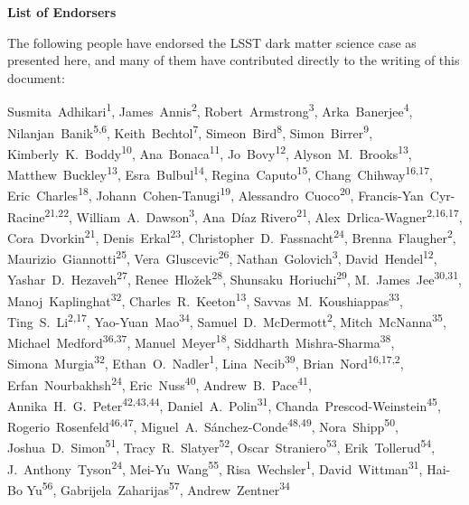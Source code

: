 
\begin{center}
  {\Large \bf List of Endorsers}
\end{center}
\bigskip

The following people have endorsed the LSST dark matter science case as presented here, and many of them have contributed directly to the writing of this document:

\def\altaffilmark#1{\textsuperscript{#1}}
\def\affil#1{\noindent #1 \\}

\normalsize
\begin{raggedright}

Susmita~Adhikari\altaffilmark{1},
James~Annis\altaffilmark{2},
Robert~Armstrong\altaffilmark{3},
Arka~Banerjee\altaffilmark{4},
Nilanjan~Banik\altaffilmark{5,6},
Keith~Bechtol\altaffilmark{7},
Simeon~Bird\altaffilmark{8},
Simon~Birrer\altaffilmark{9},
Kimberly~K.~Boddy\altaffilmark{10},
Ana~Bonaca\altaffilmark{11},
Jo~Bovy\altaffilmark{12},
Alyson~M.~Brooks\altaffilmark{13},
Matthew~Buckley\altaffilmark{13},
Esra~Bulbul\altaffilmark{14},
Regina~Caputo\altaffilmark{15},
Chang~Chihway\altaffilmark{16,17},
Eric~Charles\altaffilmark{18},
Johann~Cohen-Tanugi\altaffilmark{19},
Alessandro~Cuoco\altaffilmark{20},
Francis-Yan~Cyr-Racine\altaffilmark{21,22},
William~A.~Dawson\altaffilmark{3},
Ana~D\'{i}az Rivero\altaffilmark{21},
Alex~Drlica-Wagner\altaffilmark{2,16,17},
Cora~Dvorkin\altaffilmark{21},
Denis~Erkal\altaffilmark{23},
Christopher~D.~Fassnacht\altaffilmark{24},
Brenna~Flaugher\altaffilmark{2},
Maurizio~Giannotti\altaffilmark{25},
Vera~Gluscevic\altaffilmark{26},
Nathan~Golovich\altaffilmark{3},
David~Hendel\altaffilmark{12},
Yashar~D.~Hezaveh\altaffilmark{27},
Renee~Hlo\v{z}ek\altaffilmark{28},
Shunsaku~Horiuchi\altaffilmark{29},
M.~James~Jee\altaffilmark{30,31},
Manoj~Kaplinghat\altaffilmark{32},
Charles~R.~Keeton\altaffilmark{13},
Savvas~M.~Koushiappas\altaffilmark{33},
Ting~S.~Li\altaffilmark{2,17},
Yao-Yuan~Mao\altaffilmark{34},
Samuel~D.~McDermott\altaffilmark{2},
Mitch~McNanna\altaffilmark{35},
Michael~Medford\altaffilmark{36,37},
Manuel~Meyer\altaffilmark{18},
Siddharth~Mishra-Sharma\altaffilmark{38},
Simona~Murgia\altaffilmark{32},
Ethan~O.~Nadler\altaffilmark{1},
Lina~Necib\altaffilmark{39},
Brian~Nord\altaffilmark{16,17,2},
Erfan~Nourbakhsh\altaffilmark{24},
Eric~Nuss\altaffilmark{40},
Andrew~B.~Pace\altaffilmark{41},
Annika~H.~G.~Peter\altaffilmark{42,43,44},
Daniel~A.~Polin\altaffilmark{31},
Chanda~Prescod-Weinstein\altaffilmark{45},
Rogerio~Rosenfeld\altaffilmark{46,47},
Miguel~A.~S\'anchez-Conde\altaffilmark{48,49},
Nora~Shipp\altaffilmark{50},
Joshua~D.~Simon\altaffilmark{51},
Tracy~R.~Slatyer\altaffilmark{52},
Oscar~Straniero\altaffilmark{53},
Erik~Tollerud\altaffilmark{54},
J.~Anthony~Tyson\altaffilmark{24},
Mei-Yu~Wang\altaffilmark{55},
Risa~Wechsler\altaffilmark{1},
David~Wittman\altaffilmark{31},
Hai-Bo Yu\altaffilmark{56},
Gabrijela~Zaharijas\altaffilmark{57},
Andrew~Zentner\altaffilmark{34}


\end{raggedright}
